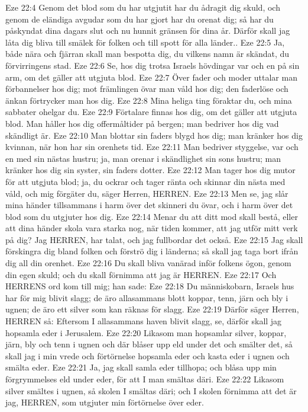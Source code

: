 Eze 22:4  Genom det blod som du har utgjutit har du ådragit dig skuld, och genom de eländiga avgudar som du har gjort har du orenat dig; så har du påskyndat dina dagars slut och nu hunnit gränsen för dina år. Därför skall jag låta dig bliva till smälek för folken och till spott för alla länder..
Eze 22:5  Ja, både nära och fjärran skall man bespotta dig, du vilkens namn är skändat, du förvirringens stad.
Eze 22:6  Se, hos dig trotsa Israels hövdingar var och en på sin arm, om det gäller att utgjuta blod.
Eze 22:7  Över fader och moder uttalar man förbannelser hos dig; mot främlingen övar man våld hos dig; den faderlöse och änkan förtrycker man hos dig.
Eze 22:8  Mina heliga ting föraktar du, och mina sabbater ohelgar du.
Eze 22:9  Förtalare finnas hos dig, om det gäller att utgjuta blod. Man håller hos dig offermåltider på bergen; man bedriver hos dig vad skändligt är.
Eze 22:10  Man blottar sin faders blygd hos dig; man kränker hos dig kvinnan, när hon har sin orenhets tid.
Eze 22:11  Man bedriver styggelse, var och en med sin nästas hustru; ja, man orenar i skändlighet sin sons hustru; man kränker hos dig sin syster, sin faders dotter.
Eze 22:12  Man tager hos dig mutor för att utgjuta blod; ja, du ockrar och tager ränta och skinnar din nästa med våld, och mig förgäter du, säger Herren, HERREN.
Eze 22:13  Men se, jag slår mina händer tillsammans i harm över det skinneri du övar, och i harm över det blod som du utgjuter hos dig.
Eze 22:14  Menar du att ditt mod skall bestå, eller att dina händer skola vara starka nog, när tiden kommer, att jag utför mitt verk på dig? Jag HERREN, har talat, och jag fullbordar det också.
Eze 22:15  Jag skall förskingra dig bland folken och förströ dig i länderna; så skall jag taga bort ifrån dig all din orenhet.
Eze 22:16  Du skall bliva vanärad inför folkens ögon, genom din egen skuld; och du skall förnimma att jag är HERREN.
Eze 22:17  Och HERRENS ord kom till mig; han sade:
Eze 22:18  Du människobarn, Israels hus har för mig blivit slagg; de äro allasammans blott koppar, tenn, järn och bly i ugnen; de äro ett silver som kan räknas för slagg.
Eze 22:19  Därför säger Herren, HERREN så: Eftersom I allasammans haven blivit slagg, se, därför skall jag hopsamla eder i Jerusalem.
Eze 22:20  Likasom man hopsamlar silver, koppar, järn, bly och tenn i ugnen och där blåser upp eld under det och smälter det, så skall jag i min vrede och förtörnelse hopsamla eder och kasta eder i ugnen och smälta eder.
Eze 22:21  Ja, jag skall samla eder tillhopa; och blåsa upp min förgrymmelses eld under eder, för att I man smältas däri.
Eze 22:22  Likasom silver smältes i ugnen, så skolen I smältas däri; och I skolen förnimma att det är jag, HERREN, som utgjuter min förtörnelse över eder.
